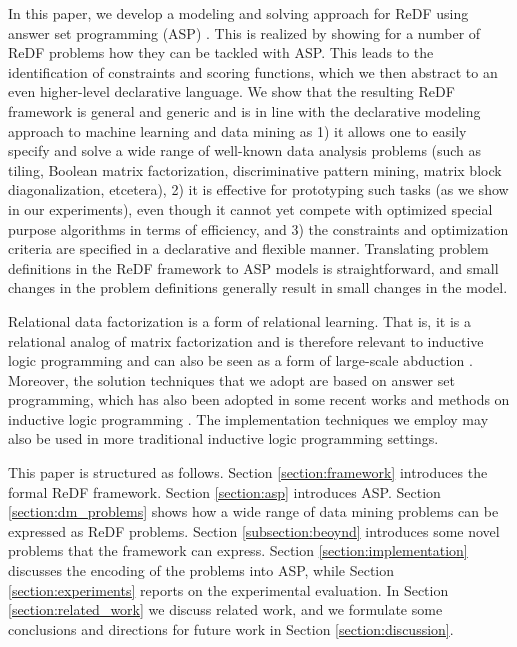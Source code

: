 In this paper, we develop a modeling and solving approach for ReDF using answer set programming (ASP) \citep{BrewkaCACM}. This is realized by showing for a number of ReDF problems how they can be tackled with ASP.  
This leads to the identification of constraints and scoring functions, which we then abstract to an even higher-level declarative language. 
We show that the resulting ReDF framework is general and generic and is in line with 
  the declarative modeling approach to machine learning and data mining as 
  1) it allows one to easily specify and solve a wide range of well-known data analysis problems (such as tiling, Boolean matrix factorization, discriminative pattern mining, matrix block diagonalization, etcetera),
  2) it is effective for prototyping such tasks (as we show in our experiments), even though it cannot yet compete with optimized special purpose algorithms in terms of efficiency, and 
  3) the constraints and optimization criteria are specified in a declarative and flexible manner. 
  Translating problem definitions in the ReDF framework to ASP models is straightforward, and small changes in the problem definitions generally result in small changes in the model. 
%

  Relational data factorization is a form of relational learning. That is, it is a relational analog of matrix factorization and is therefore relevant to inductive logic programming \citep{ilp_theory_methods,luc_book} and can also be seen as a form of large-scale abduction \citep{abduction}. Moreover, the solution techniques that we adopt are based on answer set programming, which has also been adopted in some recent works and methods on inductive logic programming \citep{ilp_graph_mining,DBLP:conf/lpnmr/Jarvisalo11}. The implementation techniques we employ may also be used in more traditional inductive logic programming settings.

  This paper is structured as follows. Section \ref{section:framework} introduces the formal ReDF framework. Section \ref{section:asp} introduces ASP. Section \ref{section:dm_problems} shows how a wide range of data mining problems can be expressed as ReDF problems. Section \ref{subsection:beoynd} introduces some novel problems that the framework can express. Section \ref{section:implementation} discusses the encoding of the problems into ASP, while Section \ref{section:experiments} reports on the experimental evaluation. In Section \ref{section:related_work} we discuss related work, and we formulate some conclusions and directions for future work in Section \ref{section:discussion}. 
